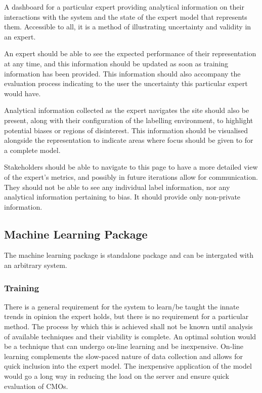 \documentclass{ecmm427_assignment}
\begin{document}
 A dashboard for a particular expert providing analytical information on their interactions with the system and the state of the expert model that represents them. Accessible to all, it is a method of illustrating uncertainty and validity in an expert.

 An expert should be able to see the expected performance of their representation at any time, and this information should be updated as soon as training information has been provided. This information should also accompany the evaluation process indicating to the user the uncertainty this particular expert would have.

 Analytical information collected as the expert navigates the site should also be present, along with their configuration of the labelling environment, to highlight potential biases or regions of disinterest. This information should be visualised alongside the representation to indicate areas where focus should be given to for a complete model.

 Stakeholders should be able to navigate to this page to have a more detailed view of the expert's metrics, and possibly in future iterations allow for communication. They should not be able to see any individual label information, nor any analytical information pertaining to bias. It should provide only non-private information.

\subsection{Machine Learning Package}

The machine learning package is standalone package and can be intergated with an arbitrary system.

\subsubsection{Training}

 There is a general requirement for the system to learn/be taught the innate trends in opinion the expert holds, but there is no requirement for a particular method. The process by which this is achieved shall not be known until analysis of available techniques and their viability is complete. An optimal solution would be a technique that can undergo on-line learning and be inexpensive. On-line learning complements the slow-paced nature of data collection and allows for quick inclusion into the expert model. The inexpensive application of the model would go a long way in reducing the load on the server and ensure quick evaluation of CMOs.
\end{document}
